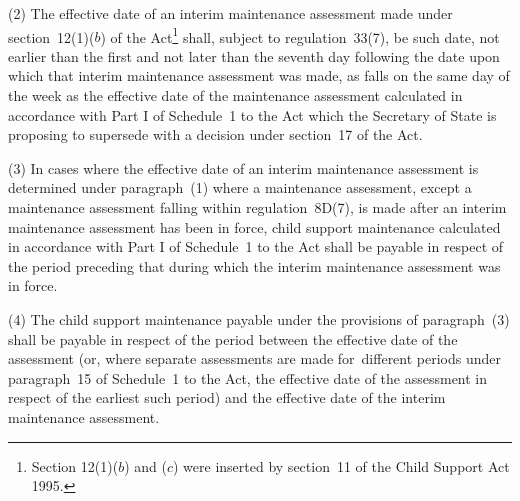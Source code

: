 \documentclass[a4paper,12pt]{article}
\begin{document}
(2) 
The effective date of an interim maintenance assessment made under section~12(1)($b$) of the Act\footnote{\frenchspacing Section 12(1)($b$) and ($c$) were inserted by section~11 of the Child Support Act 1995.} shall, subject to regulation~33(7),  %
be such date, not earlier than the first and not later than the seventh day following the date upon which that interim maintenance assessment was made, as falls on the same day of the week as the effective date of the maintenance assessment calculated in accordance with Part I of Schedule~1 to the Act which 
the Secretary of State is proposing to supersede with a decision under section~17 of the Act.  %

(3) In cases where the effective date of an interim maintenance assessment is determined under paragraph~(1)
where a maintenance assessment, except a maintenance assessment falling within regulation~8D(7), is made after an interim maintenance assessment has been in force, child support maintenance calculated in accordance with Part I of Schedule~1 to the Act shall be payable in respect of the period preceding that during which the interim maintenance assessment was in force.

(4) The child support maintenance payable under the provisions of paragraph~(3) shall be payable in respect of the period between the effective date of the assessment (or, where separate assessments are made for~different periods under paragraph~15 of Schedule~1 to the Act, the effective date of the assessment in respect of the earliest such period) and the effective date of the interim maintenance assessment.

\end{document}
